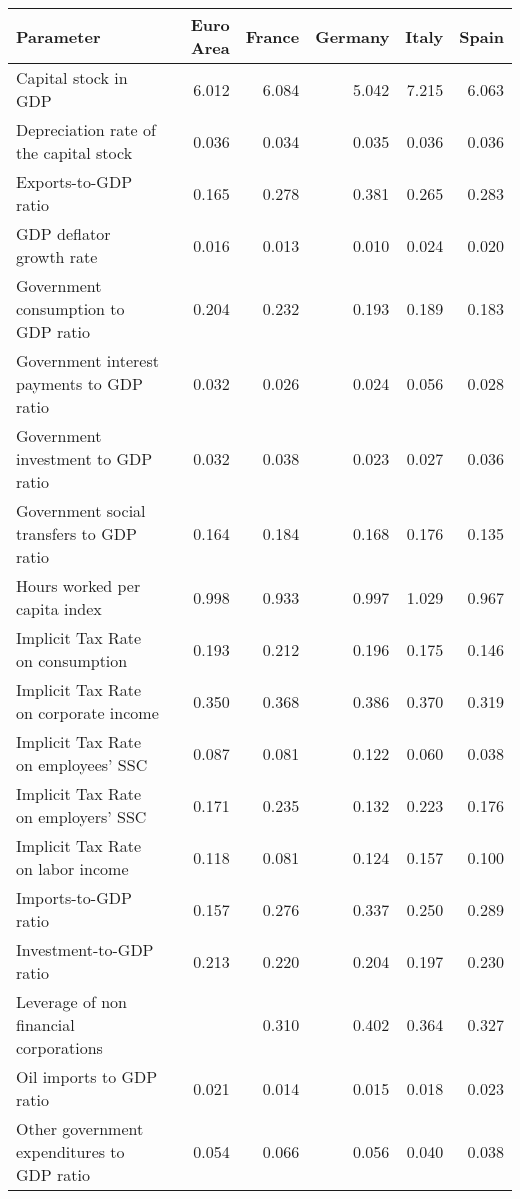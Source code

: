 \begin{table}[ht]
\centering
\begin{tabular}{lrrrrr}
  \hline
Parameter & Euro Area & France & Germany & Italy & Spain \\ 
  \hline
Capital stock in GDP & 6.012 & 6.084 & 5.042 & 7.215 & 6.063 \\ 
  Depreciation rate 
 of the capital stock & 0.036 & 0.034 & 0.035 & 0.036 & 0.036 \\ 
  Exports-to-GDP ratio & 0.165 & 0.278 & 0.381 & 0.265 & 0.283 \\ 
  GDP deflator 
 growth rate & 0.016 & 0.013 & 0.010 & 0.024 & 0.020 \\ 
  Government consumption 
 to GDP ratio & 0.204 & 0.232 & 0.193 & 0.189 & 0.183 \\ 
  Government interest 
 payments to GDP ratio & 0.032 & 0.026 & 0.024 & 0.056 & 0.028 \\ 
  Government investment 
 to GDP ratio & 0.032 & 0.038 & 0.023 & 0.027 & 0.036 \\ 
  Government social 
 transfers to GDP ratio & 0.164 & 0.184 & 0.168 & 0.176 & 0.135 \\ 
  Hours worked per 
 capita index & 0.998 & 0.933 & 0.997 & 1.029 & 0.967 \\ 
  Implicit Tax Rate 
 on consumption & 0.193 & 0.212 & 0.196 & 0.175 & 0.146 \\ 
  Implicit Tax Rate 
 on corporate income & 0.350 & 0.368 & 0.386 & 0.370 & 0.319 \\ 
  Implicit Tax Rate 
 on employees' SSC & 0.087 & 0.081 & 0.122 & 0.060 & 0.038 \\ 
  Implicit Tax Rate 
 on employers' SSC & 0.171 & 0.235 & 0.132 & 0.223 & 0.176 \\ 
  Implicit Tax Rate 
 on labor income  & 0.118 & 0.081 & 0.124 & 0.157 & 0.100 \\ 
  Imports-to-GDP ratio & 0.157 & 0.276 & 0.337 & 0.250 & 0.289 \\ 
  Investment-to-GDP ratio & 0.213 & 0.220 & 0.204 & 0.197 & 0.230 \\ 
  Leverage of non 
 financial corporations &  & 0.310 & 0.402 & 0.364 & 0.327 \\ 
  Oil imports to GDP ratio & 0.021 & 0.014 & 0.015 & 0.018 & 0.023 \\ 
  Other government 
 expenditures to GDP ratio & 0.054 & 0.066 & 0.056 & 0.040 & 0.038 \\ 

\end{tabular}
\end{table}
